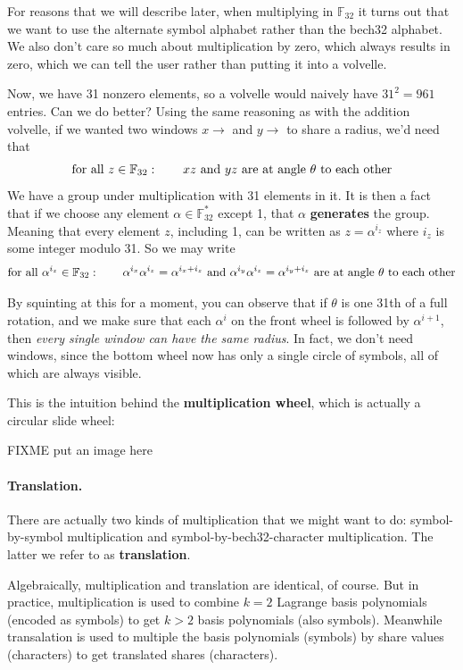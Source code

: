 \documentclass[letterpaper]{article}
\theoremstyle{xxx}
\theoremstyle{evil}
\theoremstyle{yyy}
\theoremstyle{plain}
\theoremstyle{zzz}
\newcommand{\fttwo}{\mathbb{F}_{32}}
\begin{document}
For reasons that we will describe later, when multiplying in $\fttwo$ it turns
out that we want to use the alternate symbol alphabet rather than the bech32
alphabet. We also don't care so much about multiplication by zero, which always
results in zero, which we can tell the user rather than putting it into a
volvelle.

Now, we have 31 nonzero elements, so a volvelle would naively have $31^2=961$
entries. Can we do better? Using the same reasoning as with the addition volvelle,
if we wanted two windows $x\to$ and $y\to$ to share a radius, we'd need that
\[ \textnormal{for all } z\in\fttwo:\qquad xz \textnormal{ and } yz \textnormal{ are at angle $\theta$ to each other} \]
We have a group under multiplication with 31 elements in it. It is then a fact
that if we choose any element $\alpha\in\fttwo^*$ except 1, that $\alpha$
\textbf{generates} the group. Meaning that every element $z$, including 1,
can be written as $z=\alpha^{i_z}$ where $i_z$ is some integer modulo 31. So we
may write
\[ \textnormal{for all } \alpha^{i_z}\in\fttwo:\qquad \alpha^{i_x}\alpha^{i_z} = \alpha^{i_x+i_z} \textnormal{ and } \alpha^{i_y}\alpha^{i_z} = \alpha^{i_y+i_z} \textnormal{ are at angle $\theta$ to each other} \]

By squinting at this for a moment, you can observe that if $\theta$ is one 31th
of a full rotation, and we make sure that each $\alpha^i$ on the front wheel is
followed by $\alpha^{i+1}$, then \emph{every single window can have the same
radius}. In fact, we don't need windows, since the bottom wheel now has only a
single circle of symbols, all of which are always visible.

This is the intuition behind the \textbf{multiplication wheel}, which is actually
a circular slide wheel:

FIXME put an image here

\paragraph{Translation.} There are actually two kinds of multiplication that
we might want to do: symbol-by-symbol multiplication and symbol-by-bech32-character
multiplication. The latter we refer to as \textbf{translation}.

Algebraically, multiplication and translation are identical, of course. But in
practice, multiplication is used to combine $k=2$ Lagrange basis polynomials
(encoded as symbols) to get $k>2$ basis polynomials (also symbols).
Meanwhile transalation is used to multiple the basis polynomials (symbols) by
share values (characters) to get translated shares (characters).
\end{document}
